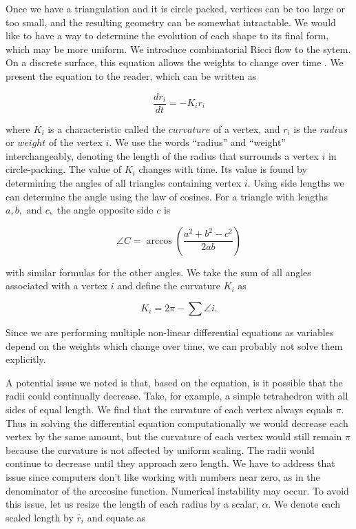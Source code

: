 \documentclass[12pt]{article}
\begin{document}
Once we have a triangulation and it is circle packed, vertices can be too large or too small, and the resulting geometry can be somewhat intractable. We would like to have a way to determine the evolution of each shape to its final form, which may be more uniform. We introduce combinatorial Ricci flow to the sytem. On a discrete surface, this equation allows the weights to change over time \cite{chowluo}. We present the equation to the reader, which can be written as

  \begin{equation}
  \label{Riccif}
  \frac{dr_i}{{dt}} = -K_ir_i
  \end{equation}
  
\noindent where $K_i$ is a characteristic called the $curvature$ of a vertex, and $r_i$ is the $radius$ or $weight$ of the vertex $i$. We use the words ``radius'' and ``weight'' interchangeably, denoting the length of the radius that surrounds a vertex $i$ in circle-packing. The value of $K_i$ changes with time. Its value is found by determining the angles of all triangles containing vertex $i$. Using side lengths we can determine the angle using the law of cosines. For a triangle with lengths $a, b,\mbox{ and }c,$ the angle opposite side $c$ is
  
  $$
  \angle C = \arccos(\frac{a^2 + b^2 - c^2}{2ab})
  $$
  
\noindent with similar formulas for the other angles. We take the sum of all angles associated with a vertex $i$ and define the curvature $K_i$ as

\begin{equation}
K_i = 2\pi - \sum{\angle i}.
\end{equation}
  
\noindent Since we are performing multiple non-linear differential equations as variables depend on the weights which change over time, we can probably not solve them explicitly.\newline
   
\noindent A potential issue we noted is that, based on the equation, is it possible that the radii could continually decrease. Take, for example, a simple tetrahedron with all sides of equal length. We find that the curvature of each vertex always equals $\pi$. Thus in solving the differential equation computationally we would decrease each vertex by the same amount, but the curvature of each vertex would still remain $\pi$ because the curvature is not affected by uniform scaling. The radii would continue to decrease until they approach zero length. We have to address that issue since computers don't like working with numbers near zero, as in the denominator of the arccosine function. Numerical instability may occur. To avoid this issue, let us resize the length of each radius by a scalar, $\alpha$. We denote each scaled length by $\tilde{r_i}$ and equate as
 
\end{document}
